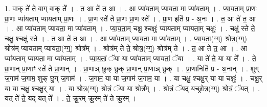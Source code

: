 \documentclass[17pt]{extarticle}
\begin{document}
1. वाक् ते॑ ते॒ वाग् वाक् ते᳚ । . त॒ आ ते॑ त॒ आ । . आ प्या॑यताम् प्यायता॒ मा प्या॑यताम् । . प्या॒य॒ता॒म् प्रा॒णः प्रा॒णः प्या॑यताम् प्यायताम् प्रा॒णः । . प्रा॒ण स्ते॑ ते प्रा॒णः प्रा॒ण स्ते᳚ । . प्रा॒ण इति॑ प्र - अ॒नः । . त॒ आ ते॑ त॒ आ । . आ प्या॑यताम् प्यायता॒ मा प्या॑यताम् । . प्या॒य॒ता॒म् चक्षु॒ श्चक्षुः॑ प्यायताम् प्यायता॒म् चक्षुः॑ । . चक्षु॑ स्ते ते॒ चक्षु॒ श्चक्षु॑ स्ते । . त॒ आ ते॑ त॒ आ । . आ प्या॑यताम् प्यायता॒ मा प्या॑यताम् । . प्या॒य॒ता॒(ग्ग्॒) श्रोत्र॒(ग्ग्॒) श्रोत्र॑म् प्यायताम् प्यायता॒(ग्ग्॒) श्रोत्र᳚म् । . श्रोत्र॑म् ते ते॒ श्रोत्र॒(ग्ग्॒) श्रोत्र॑म् ते । . त॒ आ ते॑ त॒ आ । . आ प्या॑यताम् प्यायता॒ मा प्या॑यताम् । . प्या॒य॒तां॒ ॅया या प्या॑यताम् प्यायतां॒ ॅया । . या ते॑ ते॒ या या ते᳚ । . ते॒ प्रा॒णान् प्रा॒णाꣳ स्ते॑ ते प्रा॒णान् । . प्रा॒णाञ् छुक् छुक् प्रा॒णान् प्रा॒णाञ् छुक् । . प्रा॒णानिति॑ प्र - अ॒नान् । . शुग् ज॒गाम॑ ज॒गाम॒ शुक् छुग् ज॒गाम॑ । . ज॒गाम॒ या या ज॒गाम॑ ज॒गाम॒ या । . या चक्षु॒ श्चक्षु॒र् या या चक्षुः॑ । . चक्षु॒र् या या चक्षु॒ श्चक्षु॒र् या । . या श्रोत्र॒(ग्ग्॒) श्रोत्रं॒ ॅया या श्रोत्र᳚म् । . श्रोत्रं॒ ॅयद् यच्छ्रोत्र॒(ग्ग्॒) श्रोत्रं॒ ॅयत् । . यत् ते॑ ते॒ यद् यत् ते᳚ । . ते॒ क्रू॒रम् क्रू॒रम् ते॑ ते क्रू॒रम् । \newline
\end{document}
